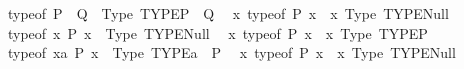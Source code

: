 \begin{isabellebody}
\ \ \ \ \ typeof\ {\isacharparenleft}{\kern0pt}P\ {\isasymlongrightarrow}\ Q{\isacharparenright}{\kern0pt}\ {\isasymequiv}\ Type\ {\isacharparenleft}{\kern0pt}TYPE{\isacharparenleft}{\kern0pt}{\isacharprime}{\kern0pt}P\ {\isasymRightarrow}\ {\isacharprime}{\kern0pt}Q{\isacharparenright}{\kern0pt}{\isacharparenright}{\kern0pt}{\isachardoublequoteclose}\isanewline
\isanewline
\ \ {\isachardoublequoteopen}{\isacharparenleft}{\kern0pt}{\isasymlambda}x{\isachardot}{\kern0pt}\ typeof\ {\isacharparenleft}{\kern0pt}P\ x{\isacharparenright}{\kern0pt}{\isacharparenright}{\kern0pt}\ {\isasymequiv}\ {\isacharparenleft}{\kern0pt}{\isasymlambda}x{\isachardot}{\kern0pt}\ Type\ {\isacharparenleft}{\kern0pt}TYPE{\isacharparenleft}{\kern0pt}Null{\isacharparenright}{\kern0pt}{\isacharparenright}{\kern0pt}{\isacharparenright}{\kern0pt}\ {\isasymLongrightarrow}\isanewline
\ \ \ \ \ typeof\ {\isacharparenleft}{\kern0pt}{\isasymforall}x{\isachardot}{\kern0pt}\ P\ x{\isacharparenright}{\kern0pt}\ {\isasymequiv}\ Type\ {\isacharparenleft}{\kern0pt}TYPE{\isacharparenleft}{\kern0pt}Null{\isacharparenright}{\kern0pt}{\isacharparenright}{\kern0pt}{\isachardoublequoteclose}\isanewline
\isanewline
\ \ {\isachardoublequoteopen}{\isacharparenleft}{\kern0pt}{\isasymlambda}x{\isachardot}{\kern0pt}\ typeof\ {\isacharparenleft}{\kern0pt}P\ x{\isacharparenright}{\kern0pt}{\isacharparenright}{\kern0pt}\ {\isasymequiv}\ {\isacharparenleft}{\kern0pt}{\isasymlambda}x{\isachardot}{\kern0pt}\ Type\ {\isacharparenleft}{\kern0pt}TYPE{\isacharparenleft}{\kern0pt}{\isacharprime}{\kern0pt}P{\isacharparenright}{\kern0pt}{\isacharparenright}{\kern0pt}{\isacharparenright}{\kern0pt}\ {\isasymLongrightarrow}\isanewline
\ \ \ \ \ typeof\ {\isacharparenleft}{\kern0pt}{\isasymforall}x{\isacharcolon}{\kern0pt}{\isacharcolon}{\kern0pt}{\isacharprime}{\kern0pt}a{\isachardot}{\kern0pt}\ P\ x{\isacharparenright}{\kern0pt}\ {\isasymequiv}\ Type\ {\isacharparenleft}{\kern0pt}TYPE{\isacharparenleft}{\kern0pt}{\isacharprime}{\kern0pt}a\ {\isasymRightarrow}\ {\isacharprime}{\kern0pt}P{\isacharparenright}{\kern0pt}{\isacharparenright}{\kern0pt}{\isachardoublequoteclose}\isanewline
\isanewline
\ \ {\isachardoublequoteopen}{\isacharparenleft}{\kern0pt}{\isasymlambda}x{\isachardot}{\kern0pt}\ typeof\ {\isacharparenleft}{\kern0pt}P\ x{\isacharparenright}{\kern0pt}{\isacharparenright}{\kern0pt}\ {\isasymequiv}\ {\isacharparenleft}{\kern0pt}{\isasymlambda}x{\isachardot}{\kern0pt}\ Type\ {\isacharparenleft}{\kern0pt}TYPE{\isacharparenleft}{\kern0pt}Null{\isacharparenright}{\kern0pt}{\isacharparenright}{\kern0pt}{\isacharparenright}{\kern0pt}\ {\isasymLongrightarrow}\isanewline

\end{isabellebody}
